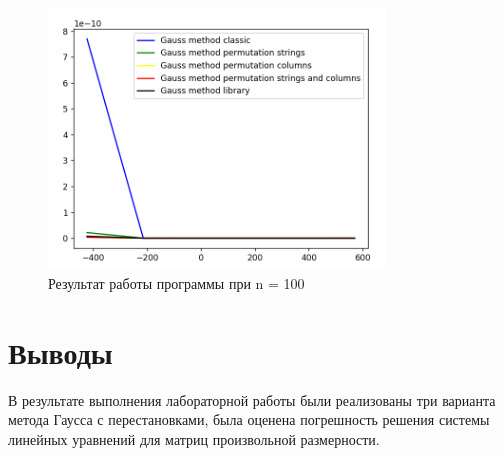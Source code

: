 \documentclass[a4paper, 14pt]{extarticle}
\begin{document}
\begin{figure}[!htb]
	\centering
	\includegraphics[width=0.8\textwidth]{img3}
\caption{Результат работы программы при n = 100}
\label{fig:img3}
\end{figure}

\section{Выводы}\label{Sect::conclusion}

В результате выполнения лабораторной работы были реализованы три варианта метода Гаусса с перестановками, была оценена погрешность решения системы линейных уравнений для матриц произвольной размерности.
\end{document}
